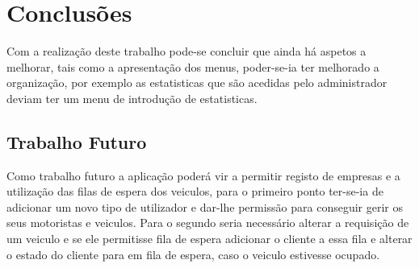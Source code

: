 \chapter{Conclusões }

Com a realização deste trabalho pode-se concluir que ainda há aspetos a melhorar, tais como a apresentação dos menus, poder-se-ia ter melhorado a organização, por exemplo as estatisticas que são acedidas pelo administrador deviam ter um menu de introdução de estatisticas. 



\section{Trabalho Futuro}

Como trabalho futuro a aplicação poderá vir a permitir registo de empresas e a utilização das filas de espera dos veiculos, para o primeiro ponto ter-se-ia de adicionar um novo tipo de utilizador e dar-lhe permissão para conseguir gerir os seus motoristas e veiculos.  Para o segundo seria necessário alterar a requisição de um veiculo e  se ele permitisse fila de espera adicionar o cliente a essa fila e alterar o estado do cliente para em fila de espera, caso o veiculo estivesse ocupado. 



